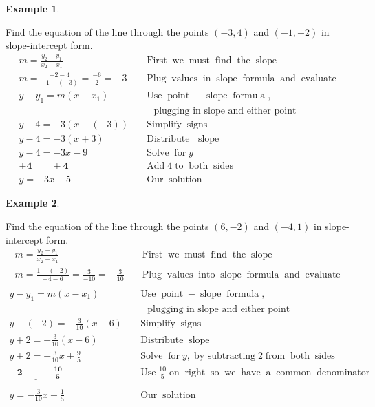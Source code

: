 \documentclass[12pt]{book}
\theoremstyle{definition}
\newtheorem{example}{Example}
\newcommand{\tmmathbf}[1]{\ensuremath{\boldsymbol{#1}}}
\newcommand{\tmop}[1]{\ensuremath{\operatorname{#1}}}
\begin{document}
\begin{example}\label{Lin66}\ \par
Find the equation of the line through the points $(- 3, 4)$ and $(- 1,- 2)$ in slope-intercept form.
  \begin{eqnarray*}
    m = \frac{y_2 - y_1}{x_2 - x_1} &  & \tmop{First} \tmop{we} \tmop{must}
    \tmop{find} \tmop{the} \tmop{slope}\\
    m = \frac{- 2 - 4}{- 1 - (- 3)} = \frac{- 6}{2} = - 3 &  & \tmop{Plug}
    \tmop{values} \tmop{in} \tmop{slope} \tmop{formula} \tmop{and}
    \tmop{evaluate}\\
    y - y_1 = m (x - x_1) &  & \tmop{Use} \tmop{point} - \tmop{slope} \tmop{formula},\\
		& &  \tmop{~~~plugging~in~slope~and~either~point}\\
    y - 4 = - 3 (x - (- 3)) &  & \tmop{Simplify} \tmop{signs}\\
    y - 4 = - 3 (x + 3) &  & \tmop{Distribute~} \tmop{slope}\\
    y - 4 = - 3 x - 9 &  & \tmop{Solve} \tmop{for} y \\
    \tmmathbf{\underline{+ 4 ~~~~~~~~~+ 4}} &  & \tmop{Add} 4 \tmop{to} \tmop{both} \tmop{sides}\\
    y = - 3 x - 5 &  & \tmop{Our} \tmop{solution}
  \end{eqnarray*}
\end{example}
\begin{example}\label{Lin67}\ \par
Find the equation of the line through the points $(6, - 2)$ and $(- 4, 1)$ in slope-intercept form.
  \begin{eqnarray*}
    m = \frac{y_2 - y_1}{x_2 - x_1} &  & \tmop{First} \tmop{we} \tmop{must}
    \tmop{find} \tmop{the} \tmop{slope}\\
    m = \frac{1 - (- 2)}{- 4 - 6} = \frac{3}{- 10} = - \frac{3}{10} &  &
    \tmop{Plug} \tmop{values} \tmop{into} \tmop{slope} \tmop{formula}
    \tmop{and} \tmop{evaluate}\\
  \end{eqnarray*}
  \begin{eqnarray*}
    y - y_1 = m (x - x_1) &  & \tmop{Use} \tmop{point} - \tmop{slope}
    \tmop{formula},\\
		& &  \tmop{~~~plugging~in~slope~and~either~point}\\
    y - (- 2) = - \frac{3}{10} (x - 6) &  & \tmop{Simplify} \tmop{signs}\\
    y + 2 = - \frac{3}{10} (x - 6) &  & \tmop{Distribute} \tmop{slope~}\\
    y + 2 = - \frac{3}{10} x + \frac{9}{5} &  & \tmop{Solve} \tmop{for} y,
    \tmop{by~subtracting} 2 \tmop{from} \tmop{both} \tmop{sides}\\
    \tmmathbf{\underline{- 2 ~~~~~~~~~- \frac{10}{5}}} &  & \tmop{Use} \frac{10}{5} \tmop{on}
    \tmop{right} \tmop{so} \tmop{we} \tmop{have} \tmop{a} \tmop{common}
    \tmop{denominator}\\
    & & \\
		y = - \frac{3}{10} x - \frac{1}{5} &  & \tmop{Our} \tmop{solution}
  \end{eqnarray*}
\end{example}
\newpage
\end{document}
